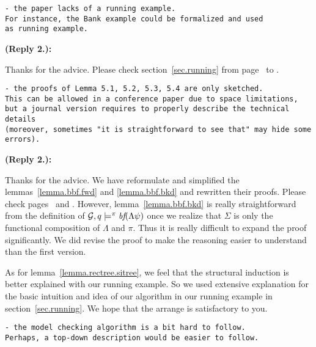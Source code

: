 \documentclass[11pt]{article}
\newcommand{\embf}{\textit{bf}}
\newcommand{\calg}{{\cal G}}
\newcounter{cabbage1}
\newcounter{cabbage2}
\newcounter{cabbage3}
\newcounter{bean1}
\newcounter{bean2}
\newcounter{bean3}
\newcounter{bean4}
\newcounter{bean5}
\newcounter{bean6}
\newenvironment{reply2}{\begin{list}{\bf (Reply 2.\arabic{bean2}):} 
        {\usecounter{bean2}\setcounter{bean2}{\value{cabbage2}} 
        \item \setcounter{cabbage2}{\value{bean2}} 
        }
}{\end{list}}
\begin{document}
\begin{verbatim} 
- the paper lacks of a running example. 
For instance, the Bank example could be formalized and used 
as running example. 
\end{verbatim} 
\begin{reply2} 
Thanks for the advice.  
Please check section~\ref{sec.running} from page~\pageref{sec.running} 
to \pageref{sec.gg}.  
\end{reply2} 
\begin{verbatim}
- the proofs of Lemma 5.1, 5.2, 5.3, 5.4 are only sketched. 
This can be allowed in a conference paper due to space limitations, 
but a journal version requires to properly describe the technical details 
(moreover, sometimes "it is straightforward to see that" may hide some errors). 
\end{verbatim} 
\begin{reply2} 
Thanks for the advice.  
We have reformulate and simplified the lemmas~\ref{lemma.bbf.fwd} and \ref{lemma.bbf.bkd} 
and rewritten their proofs. 
Please check pages~\pageref{lemma.bbf.fwd} and \pageref{lemma.bbf.bkd}.  
However, lemma~\ref{lemma.bbf.bkd} is really straightforward from the definition 
of $\calg,q\models^\pi\embf(\Lambda\psi)$ once we realize that 
$\Sigma$ is only the functional composition of $\Lambda$ and $\pi$.  
Thus it is really difficult to expand the proof significantly. 
We did revise the proof to make the reasoning easier to understand than the first version.  

As for lemma~\ref{lemma.rectree.sitree}, we feel that the structural induction is better explained 
with our running example. 
So we used extensive explanation for the basic intuition and idea of our algorithm in our 
running example in section~\ref{sec.running}.  
We hope that the arrange is satisfactory to you. 
\end{reply2} 
\begin{verbatim}
- the model checking algorithm is a bit hard to follow. 
Perhaps, a top-down description would be easier to follow. 
\end{verbatim} 
\end{document}
